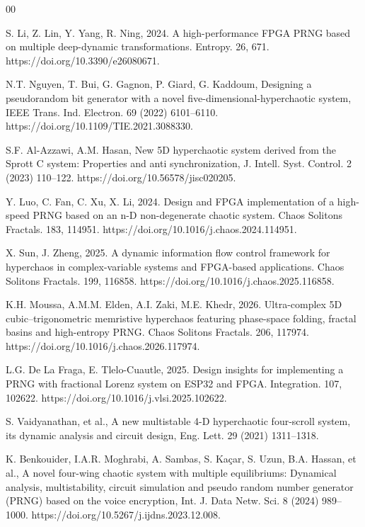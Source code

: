 \documentclass[preprint, 12pt, sort&compress]{elsarticle}
\begin{document}
\begin{thebibliography}{00}

S. Li, Z. Lin, Y. Yang, R. Ning, 2024. A high-performance FPGA PRNG based on multiple deep-dynamic transformations. Entropy. 26, 671. https://doi.org/10.3390/e26080671.

N.T. Nguyen, T. Bui, G. Gagnon, P. Giard, G. Kaddoum, Designing a pseudorandom bit generator with a novel five-dimensional-hyperchaotic system, IEEE Trans. Ind. Electron. 69 (2022) 6101–6110. https://doi.org/10.1109/TIE.2021.3088330.

S.F. Al-Azzawi, A.M. Hasan, New 5D hyperchaotic system derived from the Sprott C system: Properties and anti synchronization, J. Intell. Syst. Control. 2 (2023) 110–122. https://doi.org/10.56578/jisc020205.

Y. Luo, C. Fan, C. Xu, X. Li, 2024. Design and FPGA implementation of a high-speed PRNG based on an n-D non-degenerate chaotic system. Chaos Solitons Fractals. 183, 114951. https://doi.org/10.1016/j.chaos.2024.114951.

X. Sun, J. Zheng, 2025. A dynamic information flow control framework for hyperchaos in complex-variable systems and FPGA-based applications. Chaos Solitons Fractals. 199, 116858. https://doi.org/10.1016/j.chaos.2025.116858.

K.H. Moussa, A.M.M. Elden, A.I. Zaki, M.E. Khedr, 2026. Ultra-complex 5D cubic–trigonometric memristive hyperchaos featuring phase-space folding, fractal basins and high-entropy PRNG. Chaos Solitons Fractals. 206, 117974. https://doi.org/10.1016/j.chaos.2026.117974.

L.G. De La Fraga, E. Tlelo-Cuautle, 2025. Design insights for implementing a PRNG with fractional Lorenz system on ESP32 and FPGA. Integration. 107, 102622. https://doi.org/10.1016/j.vlsi.2025.102622.

S. Vaidyanathan, et al., A new multistable 4-D hyperchaotic four-scroll system, its dynamic analysis and circuit design, Eng. Lett. 29 (2021) 1311–1318.

K. Benkouider, I.A.R. Moghrabi, A. Sambas, S. Kaçar, S. Uzun, B.A. Hassan, et al., A novel four-wing chaotic system with multiple equilibriums: Dynamical analysis, multistability, circuit simulation and pseudo random number generator (PRNG) based on the voice encryption, Int. J. Data Netw. Sci. 8 (2024) 989–1000. https://doi.org/10.5267/j.ijdns.2023.12.008.


\end{thebibliography}
\end{document}
